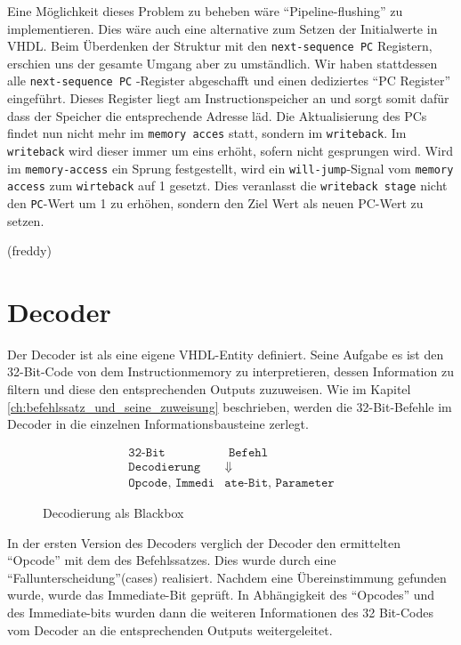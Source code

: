 \documentclass[paper=a4,fontsize=12pt,twocolumn]{scrreprt}
\begin{document}
Eine Möglichkeit dieses Problem zu beheben wäre \enquote{Pipeline-flushing} zu implementieren.
Dies wäre auch eine alternative zum Setzen der Initialwerte in VHDL.
Beim Überdenken der Struktur mit den \texttt{next-sequence PC} Registern, erschien uns der gesamte Umgang aber zu umständlich.
Wir haben stattdessen alle \texttt{next-sequence PC} -Register abgeschafft und einen dediziertes \enquote{PC Register} eingeführt.
Dieses Register liegt am Instructionspeicher an und sorgt somit dafür dass der Speicher die entsprechende Adresse läd.
Die Aktualisierung des PCs findet nun nicht mehr im \texttt{memory acces} statt, sondern im \texttt{writeback}.
Im \texttt{writeback} wird dieser immer um eins erhöht, sofern nicht gesprungen wird.
Wird im \texttt{memory-access} ein Sprung festgestellt, wird ein \texttt{will-jump}-Signal vom \texttt{memory access} zum \texttt{wirteback} auf 1 gesetzt.
Dies veranlasst die \texttt{writeback stage} nicht den \texttt{PC}-Wert um 1 zu erhöhen, sondern den Ziel  Wert als neuen PC-Wert zu setzen.


(freddy)

\section{Decoder}
\label{sec:decoder}

Der Decoder ist als eine eigene VHDL-Entity definiert.
Seine Aufgabe es ist den 32-Bit-Code von dem Instructionmemory zu interpretieren, dessen Information zu filtern und diese den entsprechenden Outputs zuzuweisen.
Wie im Kapitel \ref{ch:befehlssatz_und_seine_zuweisung} beschrieben, werden die 32-Bit-Befehle im Decoder in die einzelnen Informationsbausteine zerlegt.

\begin{figure}[h]
\centering
\begin{align*}
\texttt{32-Bit} & \texttt{ Befehl}\\
\texttt{Decodierung} & \Downarrow \\
\texttt{Opcode, Immedi} & \texttt{ate-Bit, Parameter}
\end{align*}
\caption{Decodierung als Blackbox}
\label{fig:Decodierung_blackbox}
\end{figure}

In der ersten Version des Decoders verglich der Decoder den ermittelten \enquote{Opcode} mit dem des Befehlssatzes.
Dies wurde durch eine \enquote{Fallunterscheidung}(cases) realisiert.
Nachdem eine Übereinstimmung gefunden wurde, wurde das Immediate-Bit geprüft.
In Abhängigkeit des \enquote{Opcodes} und des Immediate-bits wurden dann die weiteren Informationen des 32 Bit-Codes vom Decoder an die entsprechenden Outputs weitergeleitet.
\end{document}
